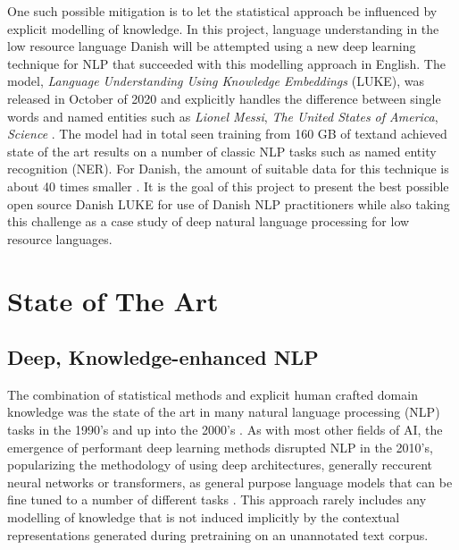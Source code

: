 \documentclass[main.tex]{subfiles}
\begin{document}
One such possible mitigation is to let the statistical approach be influenced by explicit modelling of knowledge.
In this project, language understanding in the low resource language Danish will be attempted using a new deep learning technique for NLP that succeeded with this modelling approach in English.
The model, \emph{Language Understanding Using Knowledge Embeddings} (LUKE), was released in October of 2020 and explicitly handles the difference between single words and named entities such as \emph{Lionel Messi}, \emph{The United States of America}, \emph{Science} \cite{yamada2020luke}.
The model had in total seen training from 160 GB of text\footnotemark and achieved state of the art results on a number of classic NLP tasks such as named entity recognition (NER).
For Danish, the amount of suitable data for this technique is about 40 times smaller \footnotemark.
It is the goal of this project to present the best possible open source Danish LUKE for use of Danish NLP practitioners while also taking this challenge as a case study of deep natural language processing for low resource languages.

\section{State of The Art}
\label{sota}

\subsection{Deep, Knowledge-enhanced NLP}
The combination of statistical methods and explicit human crafted domain knowledge was the state of the art in many natural language processing (NLP) tasks in the 1990's and up into the 2000's \cite[Sec. 22.5]{russell2016ai}.
As with most other fields of AI, the emergence of performant deep learning methods disrupted NLP in the 2010's, popularizing the methodology of using deep architectures, generally reccurent neural networks or transformers, as general purpose language models that can be fine tuned to a number of different tasks \cite{otter18dlnlp}.
This approach rarely includes any modelling of knowledge that is not induced implicitly by the contextual representations generated during pretraining on an unannotated text corpus.
\end{document}
